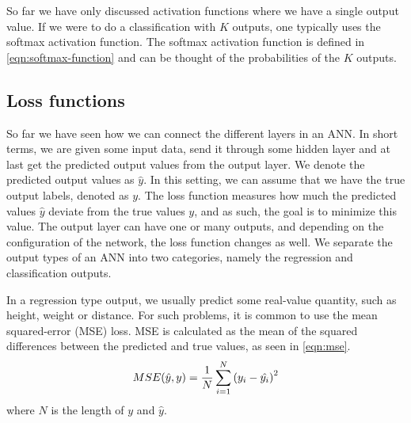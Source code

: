 So far we have only discussed activation functions where we have a single output value. If we were to do a classification with $K$ outputs, one typically uses the softmax activation function. The softmax activation function is defined in \cref{eqn:softmax-function} and can be thought of the probabilities of the $K$ outputs.

\subsection{Loss functions}
\label{sec:loss-functions-ann}
So far we have seen how we can connect the different layers in an ANN. In short terms, we are given some input data, send it through some hidden layer and at last get the predicted output values from the output layer. We denote the predicted output values as $\hat{y}$. In this setting, we can assume that we have the true output labels, denoted as $y$. The loss function measures how much the predicted values $\hat{y}$ deviate from the true values $y$, and as such, the goal is to minimize this value. The output layer can have one or many outputs, and depending on the configuration of the network, the loss function changes as well. We separate the output types of an ANN into two categories, namely the regression and classification outputs.

In a regression type output, we usually predict some real-value quantity, such as height, weight or distance. For such problems, it is common to use the mean squared-error (MSE) loss. MSE is calculated as the mean of the squared differences between the predicted and true values, as seen in \cref{eqn:mse}.
\begin{align}
    \label{eqn:mse}
    MSE(\hat{y}, y) = \frac{1}{N} \sum\limits_{i=1}^{N} {\left( y_i - \hat{y_i} \right)}^2
\end{align}
where $N$ is the length of $y$ and $\hat{y}$.

